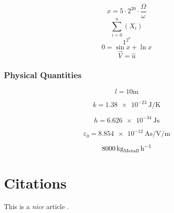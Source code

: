 \documentclass{scrartcl}
\begin{document}
$$x = 5\cdot 2^{20} \cdot \frac{\Omega}{\omega}$$
$$\sum_{i=0}^{n}(X_i)$$
$$1^{2^3}$$
$$0= \sin{x} + \ln{x}$$
$$ \vec{V} = \hat{u}$$

\subsubsection{Physical  Quantities}

$$l= 10 \text{m}$$


$$k=\SI{1.38e-23}{\joule \per\kelvin}$$

$$h=\SI{6.626e-34}{\joule \second}$$

$$\varepsilon_0=\SI[per-mode=fraction]{8.854e-12}{\ampere \second \per\volt \per\meter}$$

$$\SI{8000}{\kilo\gram\of{Metall} \per\hour}$$

\section{Citations}
This is a \emph{nice} article \cite{lemola2007maternal}.


  

\end{document}
